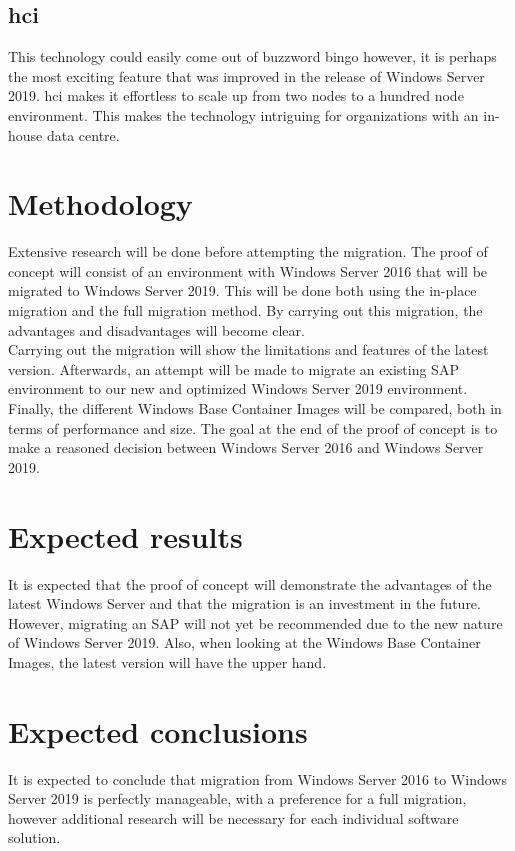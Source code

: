 \subsection{\acrfull{hci}}
This technology could easily come out of buzzword bingo however, it is perhaps the most exciting feature that was improved in the release of Windows Server 2019. 
\acrshort{hci} makes it effortless to scale up from two nodes to a hundred node environment. 
This makes the technology intriguing for organizations with an in-house data centre.
\section{Methodology}\label{sec:methodology}
Extensive research will be done before attempting the migration. The proof of concept will consist of an environment with Windows Server 2016 that will be migrated to Windows Server 2019. This will be done both using the in-place migration and the full migration method. By carrying out this migration, the advantages and disadvantages will become clear. \\
Carrying out the migration will show the limitations and features of the latest version. 
Afterwards, an attempt will be made to migrate an existing SAP environment to our new and optimized Windows Server 2019 environment.\\
Finally, the different Windows Base Container Images will be compared, both in terms of performance and size. 
The goal at the end of the proof of concept is to make a reasoned decision between Windows Server 2016 and Windows Server 2019.
\section{Expected results}\label{sec:anticipated_results}
It is expected that the proof of concept will demonstrate the advantages of the latest Windows Server and that the migration is an investment in the future. However, migrating an SAP will not yet be recommended due to the new nature of Windows Server 2019. Also, when looking at the Windows Base Container Images, the latest version will have the upper hand. 
\section{Expected conclusions}\label{sec:anticipated_conclusions}
It is expected to conclude that migration from Windows Server 2016 to Windows Server 2019 is perfectly manageable, with a preference for a full migration,  however additional research will be necessary for each individual software solution. 